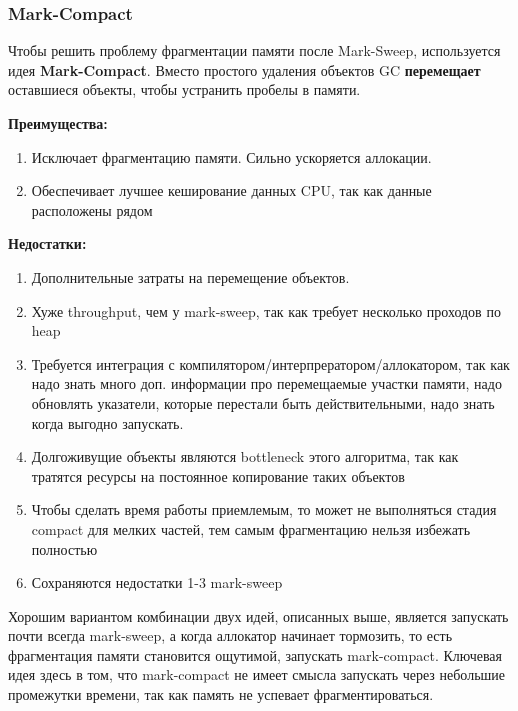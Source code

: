 \subsubsection{Mark-Compact}

Чтобы решить проблему фрагментации памяти после Mark-Sweep, используется идея \textbf{Mark-Compact}. Вместо простого удаления объектов GC \textbf{перемещает} оставшиеся объекты, чтобы устранить пробелы в памяти.

\textbf{Преимущества:}
\begin{enumerate}[label=\arabic*.]
    \item Исключает фрагментацию памяти. Сильно ускоряется аллокации.
    \item Обеспечивает лучшее кеширование данных CPU, так как данные расположены рядом
\end{enumerate}

\textbf{Недостатки:}
\begin{enumerate}[label=\arabic*.]
    \item Дополнительные затраты на перемещение объектов.
    \item Хуже throughput, чем у mark-sweep, так как требует несколько проходов по heap
    \item Требуется интеграция с компилятором/интерпрератором/аллокатором, так как надо знать много доп. информации про перемещаемые участки памяти, надо обновлять указатели, которые перестали быть действительными, надо знать когда выгодно запускать.
    \item Долгоживущие объекты являются bottleneck этого алгоритма, так как тратятся ресурсы на постоянное копирование таких объектов
    \item Чтобы сделать время работы приемлемым, то может не выполняться стадия compact для мелких частей, тем самым фрагментацию нельзя избежать полностью
    \item Сохраняются недостатки 1-3 mark-sweep
\end{enumerate}

Хорошим вариантом комбинации двух идей, описанных выше, является запускать почти всегда mark-sweep, а когда аллокатор начинает тормозить, то есть фрагментация памяти становится ощутимой, запускать mark-compact. Ключевая идея здесь в том, что mark-compact не имеет смысла запускать через небольшие промежутки времени, так как память не успевает фрагментироваться.

